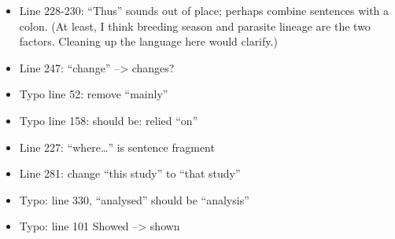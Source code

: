 \documentclass[10pt]{article}
\providecommand{\tightlist}{\setlength{\itemsep}{0pt}\setlength{\parskip}{0pt}}%
\begin{document}
\begin{itemize}
\tightlist
\item
  Line 228-230: ``Thus'' sounds out of place; perhaps combine sentences
  with a colon. (At least, I think breeding season and parasite lineage
  are the two factors. Cleaning up the language here would clarify.)
\end{itemize}

\begin{itemize}
\tightlist
\item
  Line 247: ``change'' --\textgreater{} changes?
\end{itemize}

\begin{itemize}
\tightlist
\item
  Typo line 52: remove ``mainly''
\end{itemize}

\begin{itemize}
\tightlist
\item
  Typo line 158: should be: relied ``on''
\end{itemize}

\begin{itemize}
\tightlist
\item
  Line 227: ``where\ldots{}'' is sentence fragment
\end{itemize}

\begin{itemize}
\tightlist
\item
  Line 281: change ``this study'' to ``that study''
\end{itemize}

\begin{itemize}
\tightlist
\item
  Typo: line 330, ``analysed'' should be ``analysis''
\end{itemize}

\begin{itemize}
\tightlist
\item
  Typo: line 101 Showed --\textgreater{} shown
\end{itemize}

\FloatBarrier
\end{document}
